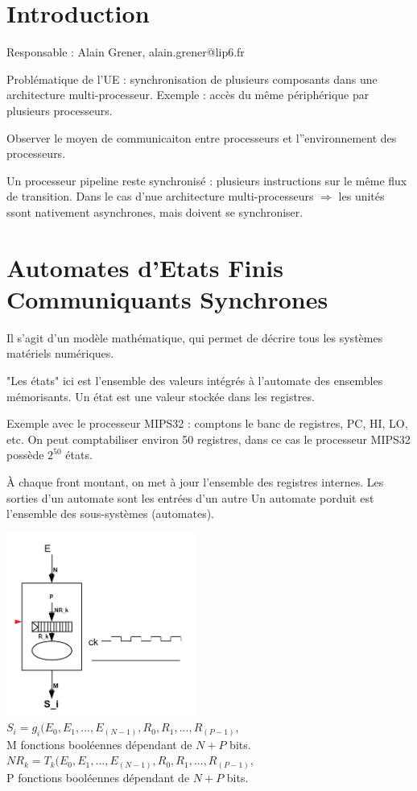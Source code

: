 \section{Introduction}
Responsable : Alain Grener, alain.grener@lip6.fr

Problématique de l'UE : synchronisation de plusieurs composants dans une architecture
multi-processeur. Exemple : accès du même périphérique par plusieurs processeurs.

Observer le moyen de communicaiton entre processeurs et l''environnement des
processeurs.

Un processeur pipeline reste synchronisé : plusieurs instructions sur le même flux
de transition. Dans le cas d'nue architecture multi-processeurs $\Rightarrow$
les unités ssont nativement asynchrones, mais doivent se synchroniser.

\section{Automates d'Etats Finis Communiquants Synchrones}

Il s'agit d'un modèle mathématique, qui permet de décrire tous les systèmes
matériels numériques.

"Les états" ici est l'ensemble des valeurs intégrés à l'automate des ensembles
mémorisants. Un état est une valeur stockée dans les registres.

Exemple avec le processeur MIPS32 : comptons le banc de registres, PC, HI, LO, etc.
On peut comptabiliser environ 50 registres, dans ce cas le processeur MIPS32
possède $2^{50}$ états.

À chaque front montant, on met à jour l'ensemble des registres internes.
Les sorties d'un automate sont les entrées d'un autre
Un automate porduit est l'ensemble des sous-systèmes (automates). \\


\begin{center}

  \includegraphics[height=6cm]{cours1/pics/automata.png}
  \(S_i=g_i(E_0,E_1,...,E_{(N-1)},R_0, R_1,...,R_{(P-1)}\), \\
  M fonctions booléennes dépendant de $N+P$ bits. \\
  \(NR_k=T_k(E_0,E_1,...,E_{(N-1)},R_0, R_1,...,R_{(P-1)}\), \\
  P fonctions booléennes dépendant de $N+P$ bits. \\
\end{center}

